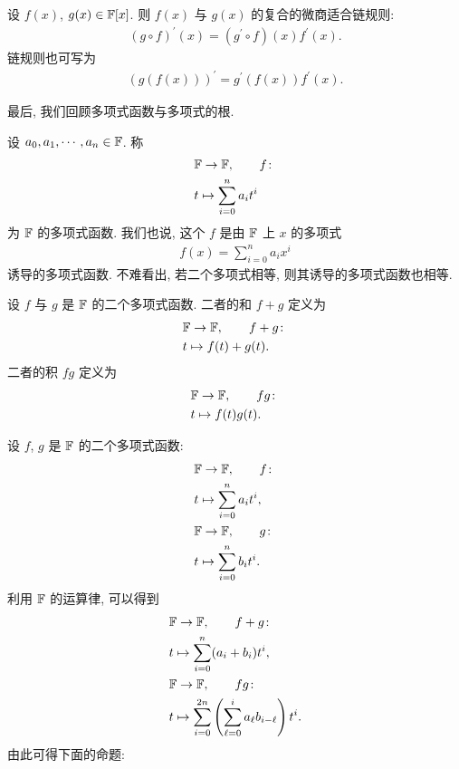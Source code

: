 \begin{proposition}
    设 $f(x)$, $g(x) \in \mathbb{F}[x]$. 则 $f(x)$ 与 $g(x)$ 的复合的微商适合链规则:
    \begin{align*}
        (g \circ f)^{\prime} (x) = (g^{\prime} \circ f)(x) f^{\prime} (x).
    \end{align*}
    链规则也可写为
    \begin{align*}
        (g(f(x)))^{\prime} = g^{\prime} (f(x)) f^{\prime} (x).
    \end{align*}
\end{proposition}

最后, 我们回顾多项式函数与多项式的根.

\begin{definition}
    设 $a_0, a_1, \cdots, a_n \in \mathbb{F}$. 称
    \begin{align*}
         & \mathbb{F} \to \mathbb{F}, \tag*{$f \colon$}   \\
         & t \mapsto \sum_{i = 0}^n a_i t^i
    \end{align*}
    为 $\mathbb{F}$ 的多项式函数. 我们也说, 这个 $f$ 是由 $\mathbb{F}$ 上 $x$ 的多项式
    \begin{align*}
        f(x) = \sum_{i = 0}^n a_i x^i
    \end{align*}
    诱导的多项式函数. 不难看出, 若二个多项式相等, 则其诱导的多项式函数也相等.
\end{definition}

\begin{definition}
    设 $f$ 与 $g$ 是 $\mathbb{F}$ 的二个多项式函数. 二者的和 $f+g$ 定义为
    \begin{align*}
         & \mathbb{F} \to \mathbb{F}, \tag*{$f+g \colon$} \\
         & t \mapsto f(t) + g(t).
    \end{align*}
    二者的积 $fg$ 定义为
    \begin{align*}
         & \mathbb{F} \to \mathbb{F}, \tag*{$fg \colon$} \\
         & t \mapsto f(t) g(t).
    \end{align*}
\end{definition}

设 $f$, $g$ 是 $\mathbb{F}$ 的二个多项式函数:
\begin{align*}
     & \mathbb{F} \to \mathbb{F}, \tag*{$f \colon$}  \\
     & t \mapsto \sum_{i=0}^n a_i t^i, \\
     & \mathbb{F} \to \mathbb{F}, \tag*{$g \colon$}  \\
     & t \mapsto \sum_{i=0}^n b_i t^i.
\end{align*}
利用 $\mathbb{F}$ 的运算律, 可以得到
\begin{align*}
     & \mathbb{F} \to \mathbb{F}, \tag*{$f+g \colon$}                                                  \\
     & t \mapsto \sum_{i=0}^n (a_i + b_i) t^i,                                           \\
     & \mathbb{F} \to \mathbb{F}, \tag*{$fg \colon$}                                                   \\
     & t \mapsto \sum_{i=0}^{2n} \left( \sum_{\ell=0}^{i} a_\ell b_{i-\ell} \right) t^i.
\end{align*}
由此可得下面的命题:

